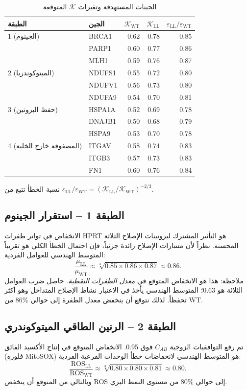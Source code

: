 \documentclass[11pt,a4paper]{article}
\newcommand{\REL}{\mathcal{K}}          %
\begin{document}
	\begin{table}[H]
		\centering
		\caption{الجينات المستهدفة وتغيرات \(\REL\) المتوقعة}
		\label{tab:targets}
		\begin{tabular}{@{}llrrr@{}}
			\toprule
			\textbf{الطبقة} & \textbf{الجين} & \(\REL_{\mathrm{WT}}\) & \(\REL_{\mathrm{LL}}\) & \(\varepsilon_{\mathrm{LL}}/\varepsilon_{\mathrm{WT}}\) \\
			\midrule
			1 (الجينوم)   & BRCA1 & 0.62 & 0.78 & 0.85 \\
			& PARP1 & 0.60 & 0.77 & 0.86 \\
			& MLH1  & 0.59 & 0.76 & 0.87 \\
			2 (الميتوكوندريا) & NDUFS1 & 0.55 & 0.72 & 0.80 \\
			& NDUFV1 & 0.56 & 0.73 & 0.80 \\
			& NDUFA9 & 0.54 & 0.70 & 0.81 \\
			3 (حفظ البروتين) & HSPA1A & 0.52 & 0.69 & 0.78 \\
			& DNAJB1 & 0.50 & 0.68 & 0.79 \\
			& HSPA9  & 0.53 & 0.70 & 0.78 \\
			4 (المصفوفة خارج الخلية) & ITGAV  & 0.58 & 0.74 & 0.83 \\
			& ITGB3  & 0.57 & 0.73 & 0.83 \\
			& FN1    & 0.60 & 0.76 & 0.84 \\
			\bottomrule
		\end{tabular}
		\footnotesize نسبة الخطأ تتبع من \(\varepsilon_{\mathrm{LL}}/\varepsilon_{\mathrm{WT}} = (\REL_{\mathrm{LL}}/\REL_{\mathrm{WT}})^{-2/3}\).
	\end{table}
	
	\subsection{الطبقة 1 – استقرار الجينوم}
	الانخفاض في تواتر طفرات HPRT هو التأثير المشترك لبروتينات الإصلاح الثلاثة المحسنة. نظراً لأن مسارات الإصلاح زائدة جزئياً، فإن احتمال الخطأ الكلي هو تقريباً المتوسط الهندسي للعوامل الفردية:
	\[
	\frac{\mu_{\mathrm{LL}}}{\mu_{\mathrm{WT}}} \approx \sqrt[3]{0.85 \times 0.86 \times 0.87} \approx 0.86.
	\]
	ملاحظة: هذا هو الانخفاض المتوقع في \emph{معدل الطفرات النقطية}. حاصل ضرب العوامل الثلاثة هو \(0.63\)؛ المتوسط الهندسي يأخذ في الاعتبار نشاط الإصلاح المتداخل وهو أكثر تحفظاً. لذلك نتوقع أن ينخفض معدل الطفرة إلى حوالي \(86\%\) من WT.
	
	\subsection{الطبقة 2 – الرنين الطاقي الميتوكوندري}
	تم رفع التوافقيات الزوجية \(C_{AB}\) فوق 0.95. الانخفاض المتوقع في إنتاج الأكسيد الفائق (فلورة MitoSOX) هو المتوسط الهندسي لانخفاضات خطأ الوحدات الفرعية الفردية:
	\[
	\frac{\mathrm{ROS}_{\mathrm{LL}}}{\mathrm{ROS}_{\mathrm{WT}}} \approx \sqrt[3]{0.80 \times 0.80 \times 0.81} \approx 0.80.
	\]
	وبالتالي من المتوقع أن ينخفض ROS إلى حوالي \(80\%\) من مستوى النمط البري.
	
\end{document}
